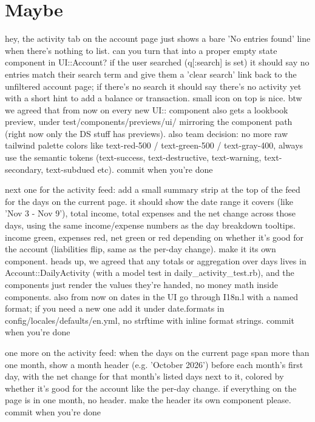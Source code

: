 \section{Maybe}
\begin{description}[style=nextline, nosep, leftmargin=1.2em]
\item[F1 (4 code, 2 stated checks)] \small hey, the activity tab on the account page just shows a bare 'No entries found' line when there's nothing to list. can you turn that into a proper empty state component in UI::Account? if the user searched (q[:search] is set) it should say no entries match their search term and give them a 'clear search' link back to the unfiltered account page; if there's no search it should say there's no activity yet with a short hint to add a balance or transaction. small icon on top is nice. btw we agreed that from now on every new UI:: component also gets a lookbook preview, under test/components/previews/ui/ mirroring the component path (right now only the DS stuff has previews). also team decision: no more raw tailwind palette colors like text-red-500 / text-green-500 / text-gray-400, always use the semantic tokens (text-success, text-destructive, text-warning, text-secondary, text-subdued etc). commit when you're done
\item[F2 (4 code, 2 stated, 2 carried, 1 leak checks)] \small next one for the activity feed: add a small summary strip at the top of the feed for the days on the current page. it should show the date range it covers (like 'Nov 3 - Nov 9'), total income, total expenses and the net change across those days, using the same income/expense numbers as the day breakdown tooltips. income green, expenses red, net green or red depending on whether it's good for the account (liabilities flip, same as the per-day change). make it its own component. heads up, we agreed that any totals or aggregation over days lives in Account::DailyActivity (with a model test in daily\_activity\_test.rb), and the components just render the values they're handed, no money math inside components. also from now on dates in the UI go through I18n.l with a named format; if you need a new one add it under date.formats in config/locales/defaults/en.yml, no strftime with inline format strings. commit when you're done
\item[F3 (4 code, 4 carried, 1 leak checks)] \small one more on the activity feed: when the days on the current page span more than one month, show a month header (e.g. 'October 2026') before each month's first day, with the net change for that month's listed days next to it, colored by whether it's good for the account like the per-day change. if everything on the page is in one month, no header. make the header its own component please. commit when you're done
\end{description}
